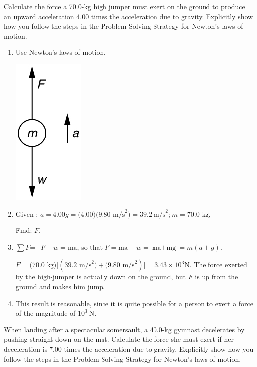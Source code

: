 \documentclass[
]{book}
\newenvironment{problems-exercises}{}{}
\begin{document}
\begin{problems-exercises}
\hypertarget{fs-id1630579}{}
\leavevmode\hypertarget{fs-id1564510}{}%
Calculate the force a 70.0-kg high jumper must exert on the ground to
produce an upward acceleration 4.00 times the acceleration due to
gravity. Explicitly show how you follow the steps in the Problem-Solving
Strategy for Newton's laws of motion.

\hypertarget{fs-id1392214}{}
\begin{enumerate}
\def\labelenumi{\arabic{enumi}.}
\item
  Use Newton's laws of motion.

  \includegraphics{images/Figure_04_06_03.jpg}
\item
  Given :
  \({{a = 4.00}{g = (}4.00)(9.\text{80\ m/s}^{2}{) = \text{39.2}}\ \text{m/s}^{2}\text{;}\ }{}\)\({{m = \text{70}}\text{.}\text{0\ kg}}{}\),

  Find: \(F{}\).
\item
  \({\sum{F\text{=+}{{F - w} = \text{ma}}\text{,}}}{}\) so that
  \({{{{F = {\text{ma} + w}} = {\text{ma} + \text{mg}}} = m}({a + g})}{}\).

  \({{F = (}\text{70.0\ kg})\lbrack(\text{39}\text{.}\text{2\ m/s}^{2}{) + (}9\text{.}\text{80\ m/s}^{2})\rbrack}{}\)\({= {3.{\text{43} \times \text{10}^{3}}\text{N}}}{}\).
  The force exerted by the high-jumper is actually down on the ground,
  but \(F{}\) is up from the ground and makes him jump.
\item
  This result is reasonable, since it is quite possible for a person
  to exert a force of the magnitude of \({\text{10}^{3}\ \text{N}}{}\).
\end{enumerate}

\hypertarget{fs-id1682349}{}
\leavevmode\hypertarget{fs-id2671484}{}%
When landing after a spectacular somersault, a 40.0-kg gymnast
decelerates by pushing straight down on the mat. Calculate the force she
must exert if her deceleration is 7.00 times the acceleration due to
gravity. Explicitly show how you follow the steps in the Problem-Solving
Strategy for Newton's laws of motion.


\end{problems-exercises}
\end{document}
